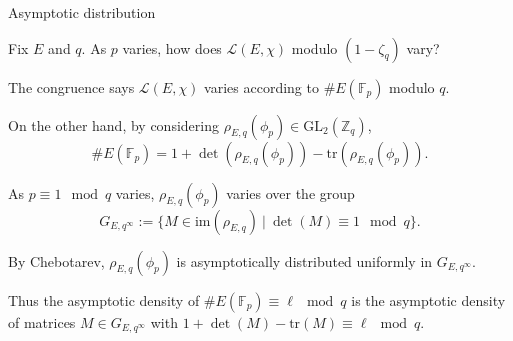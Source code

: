 \documentclass[10pt]{beamer}
\begin{document}
\begin{frame}[t]{Asymptotic distribution}

Fix $ E $ and $ q $. As $ p $ varies, how does $ \mathcal{L}(E, \chi) $ modulo $ (1 - \zeta_q) $ vary?

\pause

\vspace{0.5cm} The congruence says $ \mathcal{L}(E, \chi) $ varies according to $ \#E(\mathbb{F}_p) $ modulo $ q $.

\pause

\vspace{0.5cm} On the other hand, by considering $ \rho_{E, q}(\phi_p) \in \mathrm{GL}_2(\mathbb{Z}_q) $,
$$ \#E(\mathbb{F}_p) = 1 + \det(\rho_{E, q}(\phi_p)) - \mathrm{tr}(\rho_{E, q}(\phi_p)). $$

\pause

As $ p \equiv 1 \mod q $ varies, $ \rho_{E, q}(\phi_p) $ varies over the group
$$ G_{E, q^\infty} := \{M \in \mathrm{im}(\rho_{E, q}) \ | \ \det(M) \equiv 1 \mod q\}. $$

\pause

By Chebotarev, $ \rho_{E, q}(\phi_p) $ is asymptotically distributed uniformly in $ G_{E, q^\infty} $.

\pause

\vspace{0.5cm} Thus the asymptotic density of $ \#E(\mathbb{F}_p) \equiv \ell \mod q $ is the asymptotic density of matrices $ M \in G_{E, q^\infty} $ with $ 1 + \det(M) - \mathrm{tr}(M) \equiv \ell \mod q $.

\end{frame}
\end{document}
